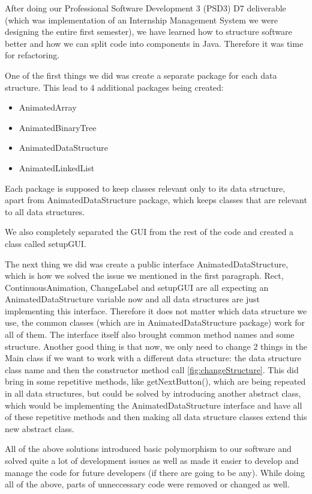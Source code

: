 \documentclass{l3proj}
\begin{document}


After doing our Professional Software Development 3 (PSD3) D7 deliverable (which was implementation of an Internship Management System we were designing the entire first semester), we have learned how to structure software better and how we can split code into components in Java. Therefore it was time for refactoring.

One of the first things we did was create a separate package for each data structure. This lead to 4 additional packages being created:
\begin{itemize} 
	\item AnimatedArray
	\item AnimatedBinaryTree
	\item AnimatedDataStructure
	\item AnimatedLinkedList
\end{itemize}
Each package is supposed to keep classes relevant only to its data structure, apart from AnimatedDataStructure package, which keeps classes that are relevant to all data structures.

We also completely separated the GUI from the rest of the code and created a class called setupGUI.



The next thing we did was create a public interface AnimatedDataStructure, which is how we solved the issue we mentioned in the first paragraph. Rect, ContinuousAnimation, ChangeLabel and setupGUI are all expecting an AnimatedDataStructure variable now and all data structures are just implementing this interface. Therefore it does not matter which data structure we use, the common classes (which are in AnimatedDataStructure package) work for all of them. The interface itself also brought common method names and some structure. Another good thing is that now, we only need to change 2 things in the Main class if we want to work with a different data structure: the data structure class name and then the constructor method call \ref{fig:changeStructure}. This did bring in some repetitive methods, like getNextButton(), which are being repeated in all data structures, but could be solved by introducing another abstract class, which would be implementing the AnimatedDataStructure interface and have all of these repetitive methods and then making all data structure classes extend this new abstract class.

All of the above solutions introduced basic polymorphism to our software and solved quite a lot of development issues as well as made it easier to develop and manage the code for future developers (if there are going to be any). While doing all of the above, parts of unneccessary code were removed or changed as well.
\end{document}
